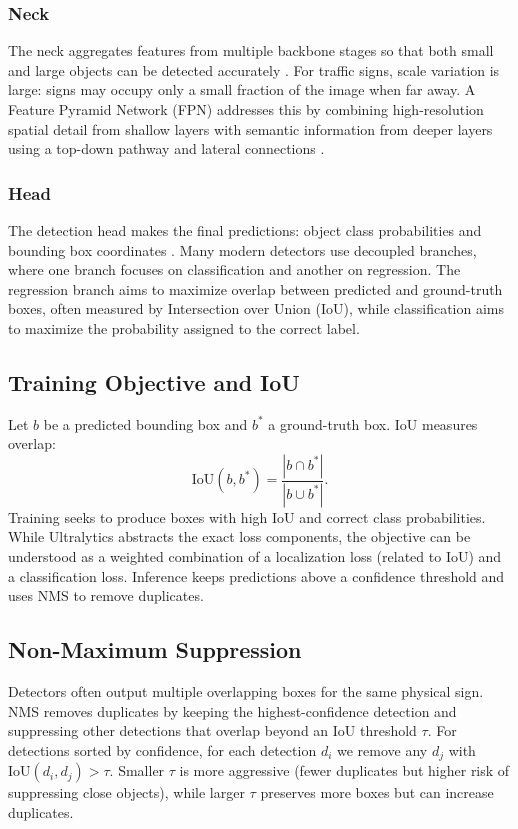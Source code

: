 \documentclass[conference]{IEEEtran}
\begin{document}
\subsubsection{Neck}
The neck aggregates features from multiple backbone stages so that both small and large objects can be detected accurately \cite{backbone}. For traffic signs, scale variation is large: signs may occupy only a small fraction of the image when far away. A Feature Pyramid Network (FPN) addresses this by combining high-resolution spatial detail from shallow layers with semantic information from deeper layers using a top-down pathway and lateral connections \cite{FPN}.

\subsubsection{Head}
The detection head makes the final predictions: object class probabilities and bounding box coordinates \cite{head}. Many modern detectors use decoupled branches, where one branch focuses on classification and another on regression. The regression branch aims to maximize overlap between predicted and ground-truth boxes, often measured by Intersection over Union (IoU), while classification aims to maximize the probability assigned to the correct label.

\subsection{Training Objective and IoU}
Let $b$ be a predicted bounding box and $b^\ast$ a ground-truth box. IoU measures overlap:
\begin{equation}
\mathrm{IoU}(b, b^\ast) = \frac{|b \cap b^\ast|}{|b \cup b^\ast|}.
\end{equation}
Training seeks to produce boxes with high IoU and correct class probabilities. While Ultralytics abstracts the exact loss components, the objective can be understood as a weighted combination of a localization loss (related to IoU) and a classification loss. Inference keeps predictions above a confidence threshold and uses NMS to remove duplicates.

\subsection{Non-Maximum Suppression}
Detectors often output multiple overlapping boxes for the same physical sign. NMS removes duplicates by keeping the highest-confidence detection and suppressing other detections that overlap beyond an IoU threshold $\tau$. For detections sorted by confidence, for each detection $d_i$ we remove any $d_j$ with $\mathrm{IoU}(d_i, d_j) > \tau$. Smaller $\tau$ is more aggressive (fewer duplicates but higher risk of suppressing close objects), while larger $\tau$ preserves more boxes but can increase duplicates.
\end{document}
